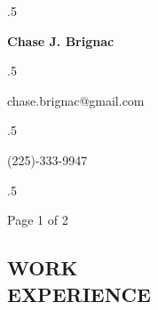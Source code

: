 \documentclass{res}
\begin{document}
 \moveleft.5\hoffset\centerline{\large\bf Chase J. Brignac}
 \moveleft.5\hoffset\centerline{chase.brignac@gmail.com}       
 \moveleft.5\hoffset\centerline{(225)-333-9947}
 \moveleft.5\hoffset\centerline{Page 1 of 2}

\begin{resume}

\section{WORK \\ EXPERIENCE} 



\end{resume}
\end{document}
